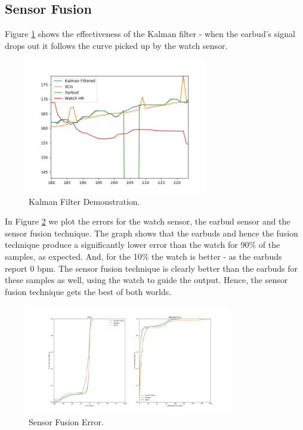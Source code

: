 \documentclass[12pt,a4paper,twoside,openright]{report}
\begin{document}
\subsection{Sensor Fusion}

Figure \ref{fig:kalman-working} shows the effectiveness of the Kalman filter -
when the earbud's signal drops out it follows the curve picked up by the
watch sensor.

\begin{figure}[tbh]
	\centerline{\includegraphics[width=0.7\textwidth]{figs/kalman-working.png}}
	\caption{Kalman Filter Demonstration.}
	\label{fig:kalman-working}
\end{figure}

In Figure \ref{fig:kalman_error} we plot the errors for the watch sensor, the
earbud sensor and the sensor fusion technique. The graph shows that the
earbuds and hence the fusion technique produce a significantly lower error than the watch for 90\% of the
samples, as expected. And, for the 10\% the watch is better - as the earbuds
report 0 bpm. The sensor fusion technique is clearly better than the earbuds
for these samples as well, using the watch to guide the output. Hence, the
sensor fusion technique gets the best of both worlds.

\begin{figure}[tbh]
	\centerline{\includegraphics[width=0.8\textwidth]{figs/kalman_validity.png}}
	\caption{Sensor Fusion Error.}
	\label{fig:kalman_error}
\end{figure}
\end{document}
